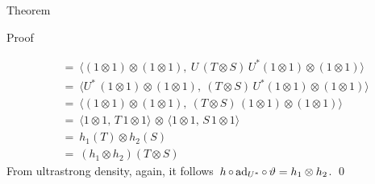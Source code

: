 \documentclass[b]{subfiles}
\begin{document}
\begin{parsec}
\begin{point}{Theorem}
\begin{point}{Proof}
\begin{point}
\begin{align*}
        & \ = \ \langle (1 \otimes 1) \otimes (1 \otimes 1),
                        \ U\, (T \otimes S)\, U^*(1 \otimes 1) \otimes (1 \otimes 1)
                        \rangle \\
        & \ = \ \langle U^* \,(1 \otimes 1) \otimes (1 \otimes 1),
                        \  (T \otimes S)\, U^*(1 \otimes 1) \otimes (1 \otimes 1)
                        \rangle \\
        & \ = \ \langle (1 \otimes 1) \otimes (1 \otimes 1),
                        \  (T \otimes S)\, (1 \otimes 1) \otimes (1 \otimes 1)
                        \rangle \\
        & \ = \
        \langle 1 \otimes 1, \,T\, 1\otimes 1\rangle \,\otimes\,
        \langle 1 \otimes 1, \,S\, 1\otimes 1\rangle \\
        & \ = \
        h_1(T) \otimes h_2(S) \\
        & \ = \
        (h_1\otimes h_2)(T \otimes S)
\end{align*}
From ultrastrong density, again, it
    follows~$h \mathop{\circ} \mathrm{ad}_{U^*} \mathop{\circ} \vartheta = h_1 \otimes h_2$. \qed
\end{point}
\end{point}
\end{point}
\end{parsec}
\end{document}
